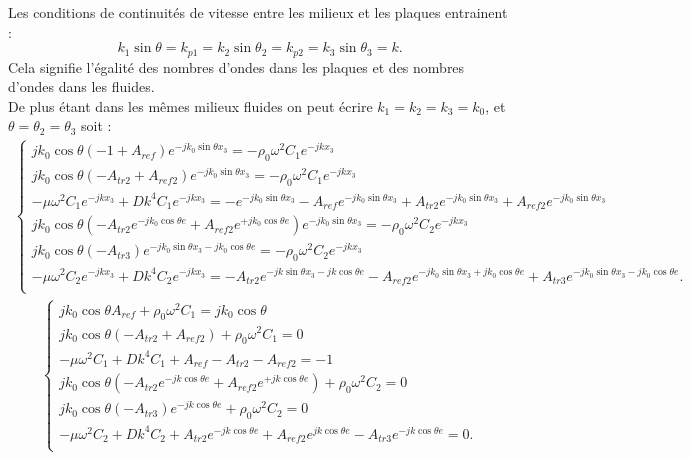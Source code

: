 \documentclass[12pt,foolscap]{report}
\begin{document}
	Les conditions de continuités de vitesse entre les milieux et les plaques entrainent : 
	\begin{equation}
	k_1 \sin\theta = k_{p1} = k_2 \sin\theta_2 =k_{p2}= k_3\sin\theta_3=k\text{.}
	\end{equation}
	Cela signifie l'égalité des nombres d'ondes dans les plaques et des nombres d'ondes dans les fluides. \\
	De plus étant dans les mêmes milieux fluides on peut écrire $k_1 = k_2 = k_3 = k_0$, et $\theta = \theta_2 =\theta_3$ soit :
	\begin{align}
	\begin{cases}
	j k_0 \cos\theta (-1+A_{ref}) e^{-jk_0\sin\theta x_3} = -\rho_0\omega^2 C_{1}e^{-jkx_3}\\
	j k_0 \cos\theta (-A_{tr2}+A_{ref2}) e^{-jk_0\sin\theta x_3} = -\rho_0\omega^2 C_{1}e^{-jkx_3}\\
	-\mu \omega^2C_{1}e^{-jkx_3}+Dk^4C_{1}e^{-jkx_3} = -e^{-jk_0\sin\theta x_3}-A_{ref}e^{-jk_0\sin\theta x_3}+A_{tr2}e^{-jk_0\sin\theta x_3}+A_{ref2}e^{-jk_0\sin\theta x_3}\\
	j k_0 \cos\theta (-A_{tr2}e^{-jk_0\cos\theta e}+A_{ref2}e^{+jk_0\cos\theta e})e^{-jk_0\sin\theta x_3}  = -\rho_0\omega^2 C_{2}e^{-jkx_3}\\
	j k_0\cos\theta (-A_{tr3}) e^{-jk_0\sin\theta x_3-jk_0\cos\theta e} = -\rho_0\omega^2 C_{2}e^{-jkx_3}\\
	-\mu \omega^2C_{2}e^{-jkx_3}+Dk^4C_{2}e^{-jkx_3} = -A_{tr2}e^{-jk\sin\theta x_3-jk\cos\theta e}-A_{ref2}e^{-jk_0\sin\theta x_3+jk_0\cos\theta e}+A_{tr3}e^{-jk_0\sin\theta x_3-jk_0\cos\theta e}\text{.}\\
	\end{cases}
	\end{align}
	\begin{align}
	\begin{cases}
	j k_0 \cos\theta A_{ref}  +\rho_0\omega^2 C_{1}=j k_0 \cos\theta \\
	j k_0 \cos\theta (-A_{tr2}+A_{ref2})  +\rho_0\omega^2 C_{1}=0\\
	-\mu \omega^2C_{1}+Dk^4C_{1} +A_{ref} -A_{tr2}-A_{ref2} = -1\\
	j k_0 \cos\theta (-A_{tr2}e^{-jk\cos\theta e}+A_{ref2}e^{+jk\cos\theta e}) +\rho_0\omega^2 C_{2} =0\\
	j k_0 \cos\theta (-A_{tr3}) e^{-jk\cos\theta e} +\rho_0\omega^2 C_{2}=0\\
	-\mu \omega^2C_{2}+Dk^4C_{2} +A_{tr2}e^{-jk\cos\theta e}+A_{ref2}e^{jk\cos\theta e}-A_{tr3}e^{-jk\cos\theta e}=0 \text{.}\\
	\end{cases}
	\end{align}
	
\end{document}
